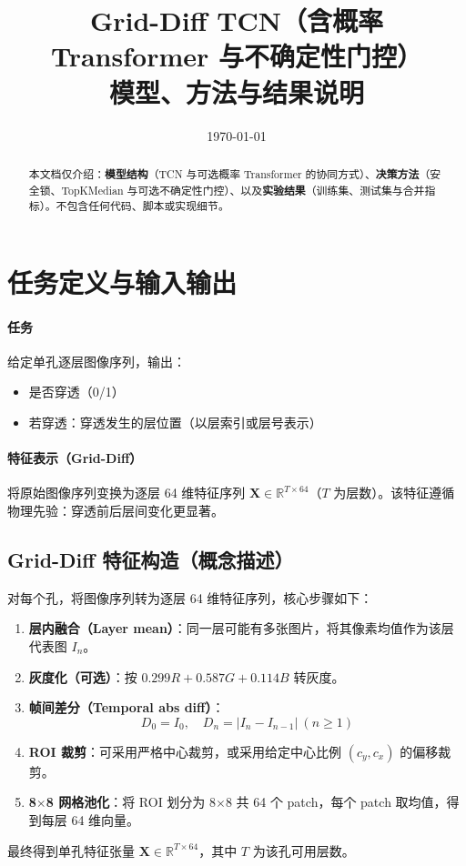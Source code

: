 \documentclass[UTF8,a4paper,11pt]{ctexart}
\title{Grid-Diff TCN（含概率 Transformer 与不确定性门控）\\模型、方法与结果说明}
\author{}
\date{\today}
\begin{document}
\maketitle

\begin{abstract}
本文档仅介绍：\textbf{模型结构}（TCN 与可选概率 Transformer 的协同方式）、\textbf{决策方法}（安全锁、TopKMedian 与可选不确定性门控）、以及\textbf{实验结果}（训练集、测试集与合并指标）。不包含任何代码、脚本或实现细节。
\end{abstract}

\tableofcontents
\newpage

\section{任务定义与输入输出}

\paragraph{任务}
给定单孔逐层图像序列，输出：
\begin{itemize}
  \item 是否穿透（0/1）
  \item 若穿透：穿透发生的层位置（以层索引或层号表示）
\end{itemize}

\paragraph{特征表示（Grid-Diff）}
将原始图像序列变换为逐层 64 维特征序列 \(\mathbf{X}\in\mathbb{R}^{T\times 64}\)（\(T\) 为层数）。该特征遵循物理先验：穿透前后层间变化更显著。

\subsection{Grid-Diff 特征构造（概念描述）}
对每个孔，将图像序列转为逐层 64 维特征序列，核心步骤如下：
\begin{enumerate}
  \item \textbf{层内融合（Layer mean）}：同一层可能有多张图片，将其像素均值作为该层代表图 \(I_n\)。
  \item \textbf{灰度化（可选）}：按 \(0.299R+0.587G+0.114B\) 转灰度。
  \item \textbf{帧间差分（Temporal abs diff）}：\[
    D_0 = I_0,\quad D_n = |I_n - I_{n-1}|\ (n\ge 1)
  \]
  \item \textbf{ROI 裁剪}：可采用严格中心裁剪，或采用给定中心比例 \((c_y,c_x)\) 的偏移裁剪。
  \item \textbf{8$\times$8 网格池化}：将 ROI 划分为 8$\times$8 共 64 个 patch，每个 patch 取均值，得到每层 64 维向量。
\end{enumerate}
最终得到单孔特征张量 \(\mathbf{X}\in\mathbb{R}^{T\times 64}\)，其中 \(T\) 为该孔可用层数。
\end{document}
